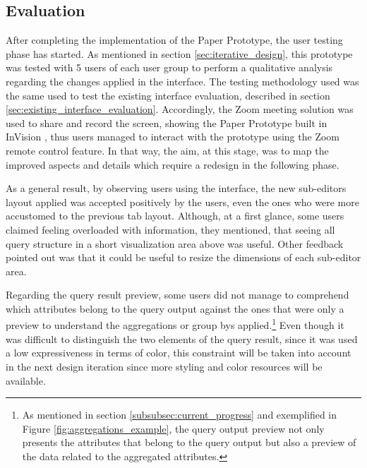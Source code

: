 
\subsection{Evaluation}
\label{subsec:paper_prototype_evaluation}

After completing the implementation of the Paper Prototype, the user testing phase has started. As mentioned in section \ref{sec:iterative_design}, this prototype was tested with 5 users of each user group to perform a qualitative analysis regarding the changes applied in the interface. The testing methodology used was the same used to test the existing interface evaluation, described in section \ref{sec:existing_interface_evaluation}. Accordingly, the Zoom \cite{zoom} meeting solution was used to share and record the screen, showing the Paper Prototype built in InVision \cite{invision}, thus users managed to interact with the prototype using the Zoom remote control feature. In that way, the aim, at this stage, was to map the improved aspects and details which require a redesign in the following phase.

As a general result, by observing users using the interface, the new sub-editors layout applied was accepted positively by the users, even the ones who were more accustomed to the previous tab layout. Although, at a first glance, some users claimed feeling overloaded with information, they mentioned, that seeing all query structure in a short visualization area above was useful. Other feedback pointed out was that it could be useful to resize the dimensions of each sub-editor area.

Regarding the query result preview, some users did not manage to comprehend which attributes belong to the query output against the ones that were only a preview to understand the aggregations or group bys applied.\footnote{As mentioned in section \ref{subsubsec:current_progress} and exemplified in Figure \ref{fig:aggregations_example}, the query output preview not only presents the attributes that belong to the query output but also a preview of the data related to the aggregated attributes.} 
Even though it was difficult to distinguish the two elements of the query result, since it was used a low expressiveness in terms of color, this constraint will be taken into account in the next design iteration since more styling and color resources will be available.

